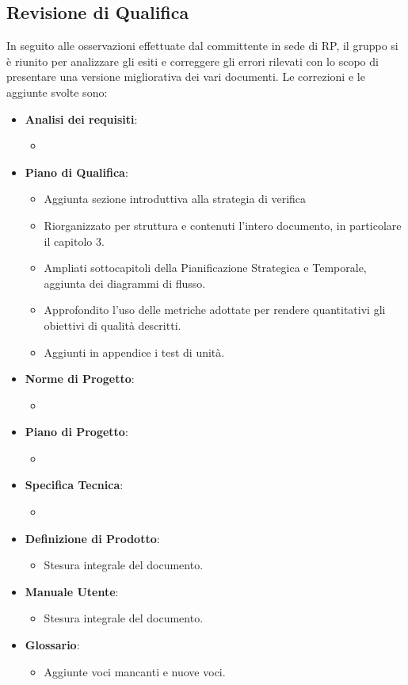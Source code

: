 \subsection{Revisione di Qualifica}
In seguito alle osservazioni effettuate dal committente in sede di RP, il gruppo \gruppo si è riunito per analizzare gli esiti e correggere gli errori rilevati con lo scopo di presentare una versione migliorativa dei vari documenti.
Le correzioni e le aggiunte svolte sono:

\begin{itemize}
	\item \textbf{Analisi dei requisiti}:
	\begin{itemize}
		\item 
	\end{itemize}
	\item \textbf{Piano di Qualifica}:
	\begin{itemize}
		\item Aggiunta sezione introduttiva alla strategia di verifica
		\item Riorganizzato per struttura e contenuti l'intero documento, in particolare il capitolo 3.
		\item Ampliati sottocapitoli della Pianificazione Strategica e Temporale, aggiunta dei diagrammi di flusso.
		\item Approfondito l'uso delle metriche adottate per rendere quantitativi gli obiettivi di qualità descritti.
		\item Aggiunti in appendice i test di unità.
	\end{itemize}
	\item \textbf{Norme di Progetto}:
	\begin{itemize}
		\item 
	\end{itemize}
	\item \textbf{Piano di Progetto}:
	\begin{itemize}
		\item 
	\end{itemize}	
	\item \textbf{Specifica Tecnica}:
	\begin{itemize}
		\item 
	\end{itemize}
	\item \textbf{Definizione di Prodotto}:
	\begin{itemize}
		\item Stesura integrale del documento.
	\end{itemize}
	\item \textbf{Manuale Utente}:
	\begin{itemize}
		\item Stesura integrale del documento.
	\end{itemize}	
	\item \textbf{Glossario}:
	\begin{itemize}
		\item Aggiunte voci mancanti e nuove voci.
	\end{itemize}
\end{itemize}
